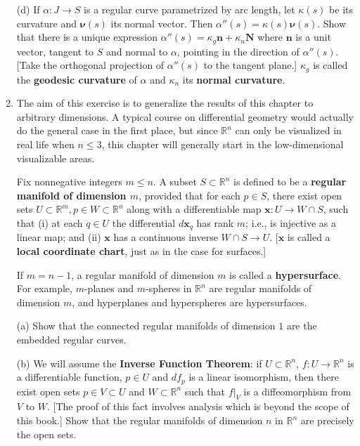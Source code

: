 \documentclass[leqno]{book}
\begin{document}
\begin{enumerate}
(d) If $\alpha:J\to S$ is a regular curve parametrized by arc length, let $\kappa(s)$ be its curvature and $\boldsymbol\nu(s)$ its normal vector.  Then $\alpha''(s)=\kappa(s)\boldsymbol\nu(s)$.  Show that there is a unique expression $\alpha''(s)=\kappa_g\mathbf n+\kappa_n\mathbf N$ where $\mathbf n$ is a unit vector, tangent to $S$ and normal to $\alpha$, pointing in the direction of $\alpha''(s)$.  [Take the orthogonal projection of $\alpha''(s)$ to the tangent plane.]  $\kappa_g$ is called the \textbf{geodesic curvature} of $\alpha$ and $\kappa_n$ its \textbf{normal curvature}.

\item The aim of this exercise is to generalize the results of this chapter to arbitrary dimensions.  A typical course on differential geometry would actually do the general case in the first place, but since $\mathbb R^n$ can only be visualized in real life when $n\leqslant 3$, this chapter will generally start in the low-dimensional visualizable areas.

Fix nonnegative integers $m\leqslant n$.  A subset $S\subset\mathbb R^n$ is defined to be a \textbf{regular manifold of dimension $m$}, provided that for each $p\in S$, there exist open sets $U\subset\mathbb R^m,p\in W\subset\mathbb R^n$ along with a differentiable map $\mathbf x:U\to W\cap S$, such that (i) at each $q\in U$ the differential $d\mathbf x_q$ has rank $m$; i.e., is injective as a linear map; and (ii) $\mathbf x$ has a continuous inverse $W\cap S\to U$.  [$\mathbf x$ is called a \textbf{local coordinate chart}, just as in the case for surfaces.]

If $m=n-1$, a regular manifold of dimension $m$ is called a \textbf{hypersurface}.  For example, $m$-planes and $m$-spheres in $\mathbb R^n$ are regular manifolds of dimension $m$, and hyperplanes and hyperspheres are hypersurfaces.

(a) Show that the connected regular manifolds of dimension $1$ are the embedded regular curves.

(b) We will assume the \textbf{Inverse Function Theorem}: if $U\subset\mathbb R^n$, $f:U\to\mathbb R^n$ is a differentiable function, $p\in U$ and $df_p$ is a linear isomorphism, then there exist open sets $p\in V\subset U$ and $W\subset\mathbb R^n$ such that $f|_V$ is a diffeomorphism from $V$ to $W$.  [The proof of this fact involves analysis which is beyond the scope of this book.]  Show that the regular manifolds of dimension $n$ in $\mathbb R^n$ are precisely the open sets.


\end{enumerate}
\end{document}
